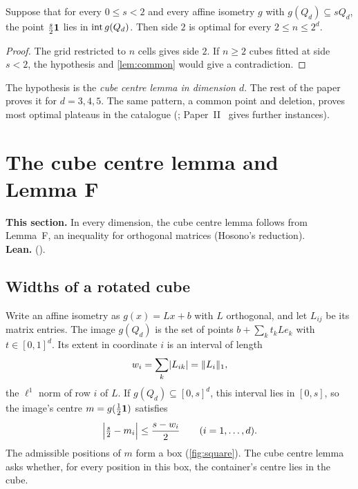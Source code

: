 \documentclass[11pt,a4paper]{article}
\begin{document}
\begin{theorem}\label{thm:plateau}
Suppose that for every $0\le s<2$ and every affine isometry $g$ with $g(Q_d)\subseteq sQ_d$, the point $\frac s2\mathbf 1$ lies in $\operatorname{int} g(Q_d)$. Then side $2$ is optimal for every $2\le n\le 2^d$.
\end{theorem}
\begin{proof}
The grid restricted to $n$ cells gives side $2$. If $n\ge 2$ cubes fitted at side $s<2$, the hypothesis and \cref{lem:common} would give a contradiction.
\end{proof}

The hypothesis is the \emph{cube centre lemma in dimension $d$}. The rest of the paper proves it for $d=3,4,5$. The same pattern, a common point and deletion, proves most optimal plateaus in the catalogue (; Paper~II~\cite{widthball} gives further instances).

\section{The cube centre lemma and Lemma F}\label{sec:lemmaF}

\begin{summarybox}
\textbf{This section.} In every dimension, the cube centre lemma follows from Lemma~F, an inequality for orthogonal matrices (Hosono's reduction).\\
\textbf{Lean.}  ().
\end{summarybox}

\subsection{Widths of a rotated cube}
Write an affine isometry as $g(x)=Lx+b$ with $L$ orthogonal, and let $L_{ij}$ be its matrix entries. The image $g(Q_d)$ is the set of points $b+\sum_k t_kLe_k$ with $t\in[0,1]^d$. Its extent in coordinate $i$ is an interval of length
\[
w_i=\sum_k \lvert L_{ik}\rvert=\lVert L_i\rVert_1 ,
\]
the $\ell^1$ norm of row $i$ of $L$. If $g(Q_d)\subseteq[0,s]^d$, this interval lies in $[0,s]$, so the image's centre $m=g(\tfrac12\mathbf 1)$ satisfies
\begin{equation}\label{eq:centre-box}
\Bigl\lvert \tfrac s2-m_i\Bigr\rvert\le \frac{s-w_i}{2}\qquad(i=1,\dots,d).
\end{equation}
The admissible positions of $m$ form a box (\cref{fig:square}). The cube centre lemma asks whether, for every position in this box, the container's centre lies in the cube.
\end{document}
